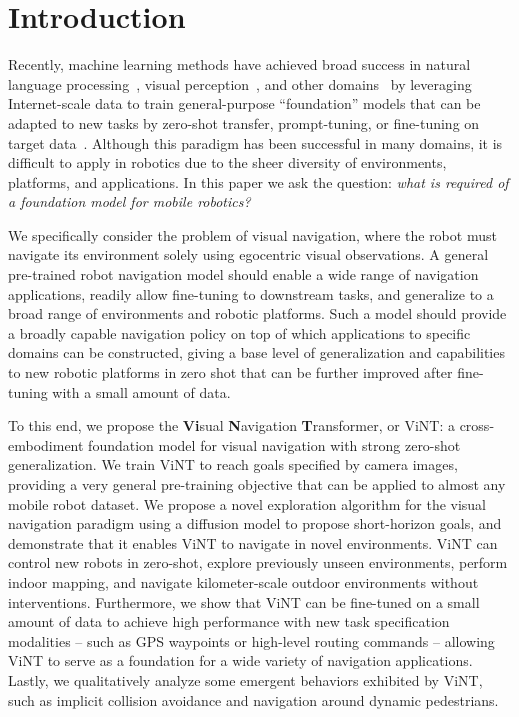 \documentclass{article}
\newcommand{\ModelName}{ViNT\xspace}
\newcommand{\basement}{foundation\xspace}
\begin{document}
\section{Introduction}
\label{sec:introduction}




Recently, machine learning methods have achieved broad success in natural language processing~\cite{Radford2018ImprovingLU}, visual perception~\cite{deng2009imagenet, carreira2017kinetics, grauman2022ego4d}, and other domains~\cite{ramesh2022dalle2, chen2021codex} by leveraging Internet-scale data to train general-purpose ``foundation'' models that can be adapted to new tasks by zero-shot transfer, prompt-tuning, or fine-tuning on target data~\cite{chen2020simple, shah2022robotic, liu2021power, lester2021power}. Although this paradigm has been successful in many domains, it is difficult to apply in robotics due to the sheer diversity of environments, platforms, and applications. In this paper we ask the question: \emph{what is required of a \basement model for mobile robotics?}

We specifically consider the problem of visual navigation, where the robot must navigate its environment solely using egocentric visual observations. A general pre-trained robot navigation model should enable a wide range of navigation applications, readily allow fine-tuning to downstream tasks, and generalize to a broad range of environments and robotic platforms. Such a model should provide a broadly capable navigation policy on top of which applications to specific domains can be constructed, giving a base level of generalization and capabilities to new robotic platforms in zero shot that can be further improved after fine-tuning with a small amount of data. %

To this end, we propose the \textbf{Vi}sual \textbf{N}avigation \textbf{T}ransformer, or \ModelName: a cross-embodiment \basement model for visual navigation with strong zero-shot generalization.
We train \ModelName to reach goals specified by camera images, providing a very general pre-training objective that can be applied to almost any mobile robot dataset.
We propose a novel exploration algorithm for the visual navigation paradigm using a diffusion model to propose short-horizon goals, and demonstrate that it enables \ModelName to navigate in novel environments.
\ModelName can control new robots in zero-shot, explore previously unseen environments, perform indoor mapping, and navigate kilometer-scale outdoor environments without interventions.
Furthermore, we show that \ModelName can be fine-tuned on a small amount of data to achieve high performance with new task specification modalities -- such as GPS waypoints or high-level routing commands -- allowing \ModelName to serve as a \basement for a wide variety of navigation applications. Lastly, we qualitatively analyze some emergent behaviors exhibited by \ModelName, such as implicit collision avoidance and navigation around dynamic pedestrians.
\end{document}
